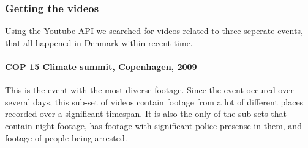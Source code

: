 %
\subsubsection{Getting the videos}
Using the Youtube API we searched for videos related to three seperate events, that all happened in Denmark within recent time.
%
\paragraph{COP 15 Climate summit, Copenhagen, 2009}
%
This is the event with the most diverse footage. Since the event occured over several days, this sub-set of videos contain footage from a lot of different places recorded over a significant timespan. It is also the only of the sub-sets that contain night footage, has footage with significant police presense in them, and footage of people being arrested.
%
